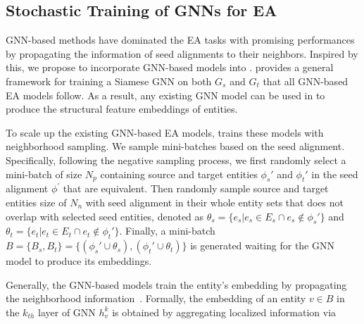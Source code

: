 \subsection{Stochastic Training of GNNs for EA}
\label{sec:mini-batch-training}

GNN-based methods \cite{AttrGNN20,KECG19, EVA20, AliNet20, DualAMN21} have dominated the EA tasks with promising performances by propagating the information of seed alignments to their neighbors.
Inspired by this, we propose to incorporate GNN-based models into \ClusterEA{}.
\ClusterEA{} provides a general framework for training a Siamese GNN on both $G_s$ and $G_t$ that all GNN-based EA models follow. As a result, any existing GNN model can be used in \ClusterEA{} to produce the structural feature embeddings of entities.

To scale up the existing GNN-based EA models, \ClusterEA{} trains these models with neighborhood sampling. We sample mini-batches based on the seed alignment. Specifically, following the negative sampling process, we first randomly select a mini-batch of size $N_p$ containing source and target entities $\phi_s'$ and $\phi_t'$ in the seed alignment $\phi^{\prime}$ that are equivalent. Then randomly sample source and target entities size of $N_n$ with seed alignment in their whole entity sets that does not overlap with selected seed entities, denoted as $\theta_s = \{e_s |e_s \in E_s \cap e_s \not\in \phi_s'\}$ and $\theta_t = \{e_t |e_t \in E_t \cap e_t \not\in \phi_t'\}$. Finally, a mini-batch $B = \{B_s, B_t\} = \{(\phi_s' \cup \theta_s), (  \phi_t' \cup \theta_t) \}$ is generated waiting for the GNN model to produce its embeddings.

Generally, the GNN-based models train the entity's embedding by propagating the neighborhood information~\cite{RREA20, GCN17, GAT18}.
Formally, the embedding of an entity $v \in B$ in the $k_{th}$ layer of GNN $h_v^k$ is obtained by aggregating localized information via 

